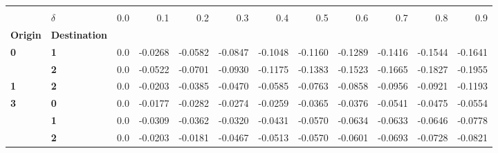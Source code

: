 \begin{tabular}{llrrrrrrrrrr}
\toprule
  & {} \\
  & \textbf{\(\delta\)} &  0.0 &     0.1 &     0.2 &     0.3 &     0.4 &     0.5 &     0.6 &     0.7 &     0.8 &     0.9 \\
\textbf{Origin} & \textbf{Destination} &      &         &         &         &         &         &         &         &         &         \\
\midrule
\textbf{0} & \textbf{1} &  0.0 & -0.0268 & -0.0582 & -0.0847 & -0.1048 & -0.1160 & -0.1289 & -0.1416 & -0.1544 & -0.1641 \\
  & \textbf{2} &  0.0 & -0.0522 & -0.0701 & -0.0930 & -0.1175 & -0.1383 & -0.1523 & -0.1665 & -0.1827 & -0.1955 \\
\textbf{1} & \textbf{2} &  0.0 & -0.0203 & -0.0385 & -0.0470 & -0.0585 & -0.0763 & -0.0858 & -0.0956 & -0.0921 & -0.1193 \\
\textbf{3} & \textbf{0} &  0.0 & -0.0177 & -0.0282 & -0.0274 & -0.0259 & -0.0365 & -0.0376 & -0.0541 & -0.0475 & -0.0554 \\
  & \textbf{1} &  0.0 & -0.0309 & -0.0362 & -0.0320 & -0.0431 & -0.0570 & -0.0634 & -0.0633 & -0.0646 & -0.0778 \\
  & \textbf{2} &  0.0 & -0.0203 & -0.0181 & -0.0467 & -0.0513 & -0.0570 & -0.0601 & -0.0693 & -0.0728 & -0.0821 \\
\bottomrule
\end{tabular}
